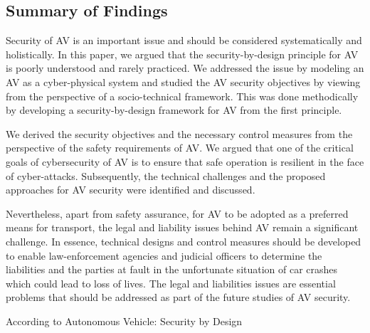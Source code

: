 \subsection{Summary of Findings}\label{subsec:summary-of-findings}
Security of AV is an important issue and should be
considered systematically and holistically. In this paper, we
argued that the security-by-design principle for AV is poorly
understood and rarely practiced. We addressed the issue by
modeling an AV as a cyber-physical system and studied the
AV security objectives by viewing from the perspective of
a socio-technical framework. This was done methodically by
developing a security-by-design framework for AV from the
first principle.

We derived the security objectives and the necessary control
measures from the perspective of the safety requirements of
AV. We argued that one of the critical goals of cybersecurity
of AV is to ensure that safe operation is resilient in the face
of cyber-attacks. Subsequently, the technical challenges and
the proposed approaches for AV security were identified and
discussed.

Nevertheless, apart from safety assurance, for AV to be
adopted as a preferred means for transport, the legal and
liability issues behind AV remain a significant challenge. In
essence, technical designs and control measures should be
developed to enable law-enforcement agencies and judicial
officers to determine the liabilities and the parties at fault in the
unfortunate situation of car crashes which could lead to loss
of lives. The legal and liabilities issues are essential problems
that should be addressed as part of the future studies of AV
security.

According to Autonomous Vehicle: Security by Design




